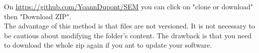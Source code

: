 \documentclass[manual-fr.tex]{subfiles}
\begin{document}
On \url{https://github.com/YoannDupont/SEM} you can click on "clone or download" then "Download ZIP".\\

The advantage of this method is that files are not versioned. It is not necessary to be cautious about modifying the folder's content. The drawback is that you need to download the whole zip again if you ant to update your software.
\end{document}

